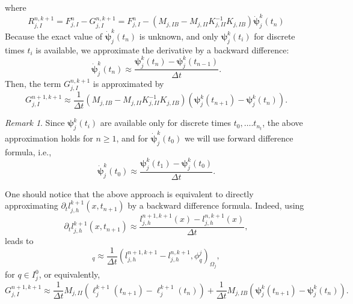 \documentclass[a4paper, 11pt]{article}
\theoremstyle{remark}
\newtheorem{remark}[equation]{Remark}
\begin{document}
\begin{enumerate}[label = (\arabic*)]
\begin{equation*}
\end{equation*}
where
\begin{equation*}
    R^{n, k+1}_{j, I} =  F^{n}_{j, I} - G_{j, I}^{n, k+1} = F^{n}_{j, I} - \left(M_{j, IB} - M_{j, II}K_{j, II}^{-1}K_{j, IB}\right)\boldsymbol{\dot{\psi}}_{j}^{k}(t_{n})
\end{equation*}
Because the exact value of $\boldsymbol{\dot{\psi}}_{j}^{k}(t_{n})$ is unknown, and only $\boldsymbol{\psi}_{j}^{k}(t_{i})$ for discrete times $t_{i}$ is available, we approximate the derivative by a backward difference:
\begin{equation*}
    \boldsymbol{\dot{\psi}}_{j}^{k}(t_{n}) \approx \dfrac{\boldsymbol{\psi}_{j}^{k}(t_{n}) - \boldsymbol{\psi}_{j}^{k}(t_{n-1})}{\Delta t}.
\end{equation*}
Then, the term $G_{j, I}^{n, k+1}$ is approximated by
\begin{equation*}
    G_{j, I}^{n+1, k+1} \approx \dfrac{1}{\Delta t}\left(M_{j, IB} - M_{j, II}K_{j, II}^{-1}K_{j, IB}\right)\left(\boldsymbol{\psi}_{j}^{k}(t_{n+1}) - \boldsymbol{\psi}_{j}^{k}(t_{n})\right).
\end{equation*}
\begin{remark}
    Since $\boldsymbol{\psi}_{j}^{k}(t_{i})$ are available only for discrete times $t_{0}, \ldots. t_{n_{t}}$, the above approximation holds for 
    $n\geq 1$, and for $\boldsymbol{\dot{\psi}}_{j}^{k}(t_{0})$ we will use forward difference formula, i.e.,
    \begin{equation*}
        \boldsymbol{\dot{\psi}}_{j}^{k}(t_{0}) \approx \dfrac{\boldsymbol{\psi}_{j}^{k}(t_{1}) - \boldsymbol{\psi}_{j}^{k}(t_{0})}{\Delta t}.
    \end{equation*}
\end{remark}
\noindent One should notice that the above approach is equivalent to directly approximating $\partial_t l_{j, h}^{k+1}(x, t_{n+1})$ by a backward 
difference formula. Indeed, using
\begin{equation*}
    \partial_t l_{j, h}^{k+1}(x, t_{n+1}) \approx \dfrac{l_{j, h}^{n+1, k+1}(x) - l_{j, h}^{n, k+1}(x)}{\Delta t},
\end{equation*}
leads to
\begin{equation*}
    [G^{n+1, k+1}_{j}]_q \approx \dfrac{1}{\Delta t}\left(l_{j, h}^{n+1, k+1} - l_{j, h}^{n, k+1}, \phi_{q}^{j}\right)_{\Omega_j},
\end{equation*}
for $q\in I_{j}^{0}$, or equivalently,
\begin{equation*}
    G^{n+1, k+1}_{j, I} \approx \dfrac{1}{\Delta t}M_{j, II}\left(\boldsymbol{\ell}_{j}^{k+1}(t_{n+1}) - \boldsymbol{\ell}_{j}^{k+1}(t_{n})\right) + \dfrac{1}{\Delta t}M_{j, IB}\left(\boldsymbol{\psi}_{j}^{k}(t_{n+1}) - \boldsymbol{\psi}_{j}^{k}(t_{n})\right).

\end{equation*}
\end{enumerate}
\end{document}
